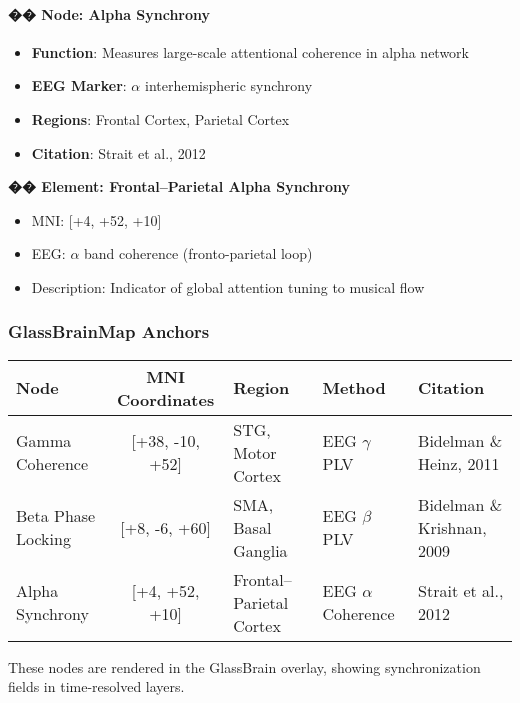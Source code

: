 \documentclass[10pt]{article}
\begin{document}
\paragraph{�� Node: Alpha Synchrony}

\begin{itemize}
    \item \textbf{Function}: Measures large-scale attentional coherence in alpha network
    \item \textbf{EEG Marker}: $\alpha$ interhemispheric synchrony
    \item \textbf{Regions}: Frontal Cortex, Parietal Cortex
    \item \textbf{Citation}: Strait et al., 2012
\end{itemize}

\textbf{�� Element: Frontal–Parietal Alpha Synchrony}

\begin{itemize}
    \item MNI: [+4, +52, +10]
    \item EEG: $\alpha$ band coherence (fronto-parietal loop)
    \item Description: Indicator of global attention tuning to musical flow
\end{itemize}

\subsubsection*{GlassBrainMap Anchors}

\begin{center}
\begin{tabular}{|l|c|l|l|l|}
\hline
\textbf{Node} & \textbf{MNI Coordinates} & \textbf{Region} & \textbf{Method} & \textbf{Citation} \\
\hline
Gamma Coherence & [+38, -10, +52] & STG, Motor Cortex & EEG $\gamma$ PLV & Bidelman \& Heinz, 2011 \\
Beta Phase Locking & [+8, -6, +60] & SMA, Basal Ganglia & EEG $\beta$ PLV & Bidelman \& Krishnan, 2009 \\
Alpha Synchrony & [+4, +52, +10] & Frontal–Parietal Cortex & EEG $\alpha$ Coherence & Strait et al., 2012 \\
\hline
\end{tabular}
\end{center}

These nodes are rendered in the GlassBrain overlay, showing synchronization fields in time-resolved layers.
\end{document}
